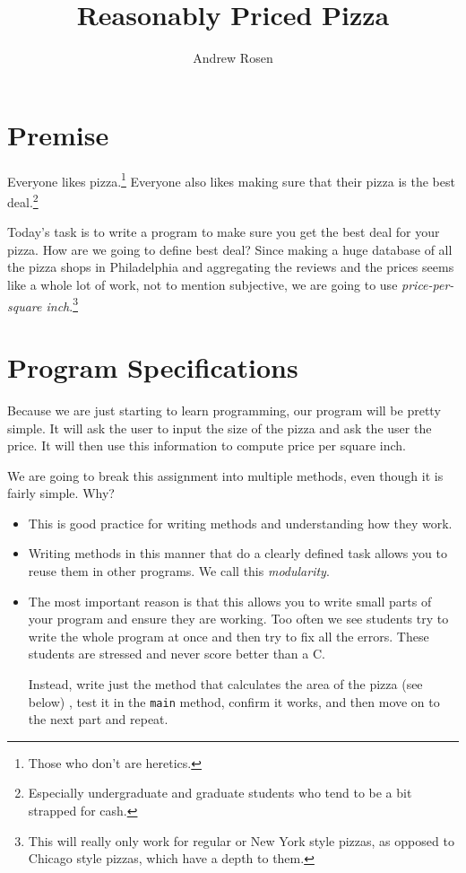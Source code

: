 \documentclass[10pt,letterpaper]{article}
\author{Andrew Rosen}
\title{Reasonably Priced Pizza}
\date{}
\begin{document}
	
	\maketitle
	\section{Premise}
	Everyone likes pizza.\footnote{Those who don't are heretics.}
	Everyone also likes making sure that their pizza is the best deal.\footnote{Especially undergraduate and graduate students who tend to be a bit strapped for cash.}
	
	Today's task is to write a program to make sure you get the best deal for your pizza.
	How are we going to define best deal? 
	Since making a huge database of all the pizza shops in Philadelphia and aggregating the reviews and the prices seems like a whole lot of work, not to mention subjective, we are going to use \textit{price-per-square inch}.\footnote{This will really only work for regular or New York style pizzas, as opposed to Chicago style pizzas, which have a depth to them.}

	\section{Program Specifications} 
	
	Because we are just starting to learn programming, our program will be pretty simple.
	It will ask the user to input the size of the pizza and ask the user the price.
	It will then use this information to compute price per square inch.
	
	We are going to break this assignment into multiple methods, even though it is fairly simple.
	Why?
	\begin{itemize}
		\item This is good practice for writing methods and understanding how they work.
		\item Writing methods in this manner that do a clearly defined task allows you to reuse them in other programs.  We call this \textit{modularity}.
		\item The most important reason is that this allows you to write small parts of your program and ensure they are working.  
		Too often we see students try to write the whole program at once and then try to fix all the errors.  
		These students are stressed and never score better than a C.
		
		Instead, write just the method that calculates the area of the pizza (see below) , test it in the \texttt{main} method, confirm it works, and then move on to the next part and repeat.
	\end{itemize}
	
\end{document}
